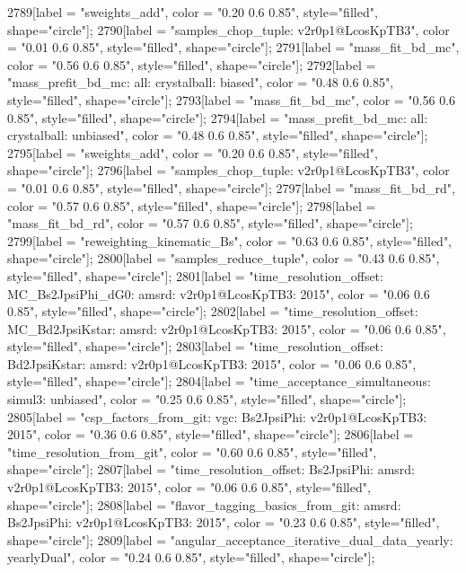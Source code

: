 {	2789[label = "sweights_add", color = "0.20 0.6 0.85", style="filled", shape="circle"];
	2790[label = "samples_chop_tuple\nversion: v2r0p1@LcosKpTB3", color = "0.01 0.6 0.85", style="filled", shape="circle"];
	2791[label = "mass_fit_bd_mc", color = "0.56 0.6 0.85", style="filled", shape="circle"];
	2792[label = "mass_prefit_bd_mc\nmassbin: all\nmassmodel: crystalball\ntrigger: biased", color = "0.48 0.6 0.85", style="filled", shape="circle"];
	2793[label = "mass_fit_bd_mc", color = "0.56 0.6 0.85", style="filled", shape="circle"];
	2794[label = "mass_prefit_bd_mc\nmassbin: all\nmassmodel: crystalball\ntrigger: unbiased", color = "0.48 0.6 0.85", style="filled", shape="circle"];
	2795[label = "sweights_add", color = "0.20 0.6 0.85", style="filled", shape="circle"];
	2796[label = "samples_chop_tuple\nversion: v2r0p1@LcosKpTB3", color = "0.01 0.6 0.85", style="filled", shape="circle"];
	2797[label = "mass_fit_bd_rd", color = "0.57 0.6 0.85", style="filled", shape="circle"];
	2798[label = "mass_fit_bd_rd", color = "0.57 0.6 0.85", style="filled", shape="circle"];
	2799[label = "reweighting_kinematic_Bs", color = "0.63 0.6 0.85", style="filled", shape="circle"];
	2800[label = "samples_reduce_tuple", color = "0.43 0.6 0.85", style="filled", shape="circle"];
	2801[label = "time_resolution_offset\nmode: MC_Bs2JpsiPhi_dG0\ntimeres: amsrd\nversion: v2r0p1@LcosKpTB3\nyear: 2015", color = "0.06 0.6 0.85", style="filled", shape="circle"];
	2802[label = "time_resolution_offset\nmode: MC_Bd2JpsiKstar\ntimeres: amsrd\nversion: v2r0p1@LcosKpTB3\nyear: 2015", color = "0.06 0.6 0.85", style="filled", shape="circle"];
	2803[label = "time_resolution_offset\nmode: Bd2JpsiKstar\ntimeres: amsrd\nversion: v2r0p1@LcosKpTB3\nyear: 2015", color = "0.06 0.6 0.85", style="filled", shape="circle"];
	2804[label = "time_acceptance_simultaneous\ntimeacc: simul3\ntrigger: unbiased", color = "0.25 0.6 0.85", style="filled", shape="circle"];
	2805[label = "csp_factors_from_git\ncsp: vgc\nmode: Bs2JpsiPhi\nversion: v2r0p1@LcosKpTB3\nyear: 2015", color = "0.36 0.6 0.85", style="filled", shape="circle"];
	2806[label = "time_resolution_from_git", color = "0.60 0.6 0.85", style="filled", shape="circle"];
	2807[label = "time_resolution_offset\nmode: Bs2JpsiPhi\ntimeres: amsrd\nversion: v2r0p1@LcosKpTB3\nyear: 2015", color = "0.06 0.6 0.85", style="filled", shape="circle"];
	2808[label = "flavor_tagging_basics_from_git\nflavor: amsrd\nmode: Bs2JpsiPhi\nversion: v2r0p1@LcosKpTB3\nyear: 2015", color = "0.23 0.6 0.85", style="filled", shape="circle"];
	2809[label = "angular_acceptance_iterative_dual_data_yearly\nangacc: yearlyDual", color = "0.24 0.6 0.85", style="filled", shape="circle"];
}
